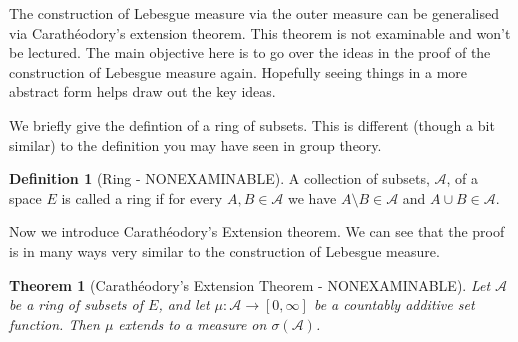 \documentclass[
]{book}
\newtheorem{theorem}{Theorem}[chapter]
\theoremstyle{definition}
\newtheorem{definition}{Definition}[chapter]
\theoremstyle{definition}
\theoremstyle{definition}
\theoremstyle{definition}
\theoremstyle{remark}
\begin{document}
The construction of Lebesgue measure via the outer measure can be generalised via Carathéodory's extension theorem. This theorem is not examinable and won't be lectured. The main objective here is to go over the ideas in the proof of the construction of Lebesgue measure again. Hopefully seeing things in a more abstract form helps draw out the key ideas.

We briefly give the defintion of a ring of subsets. This is different (though a bit similar) to the definition you may have seen in group theory.

\begin{definition}[Ring - NONEXAMINABLE]
A collection of subsets, \(\mathcal{A}\), of a space \(E\) is called a ring if for every \(A,B \in \mathcal{A}\) we have \(A \setminus B \in \mathcal{A}\) and \(A \cup B \in \mathcal{A}\).
\end{definition}

Now we introduce Carathéodory's Extension theorem. We can see that the proof is in many ways very similar to the construction of Lebesgue measure.

\begin{theorem}[Carathéodory's Extension Theorem - NONEXAMINABLE]
Let \(\mathcal{A}\) be a ring of subsets of \(E\), and let \(\mu: \mathcal{A} \rightarrow [0, \infty]\) be a countably additive set function. Then \(\mu\) extends to a measure on \(\sigma(\mathcal{A})\).
\end{theorem}
\end{document}
